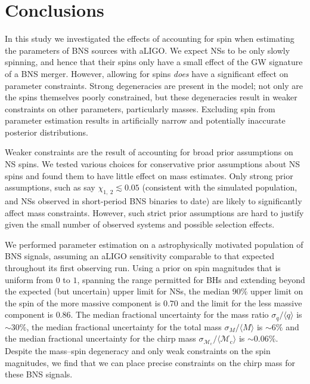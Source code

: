 \section{Conclusions}\label{sec:conclusions}

In this study we investigated the effects of accounting for spin when estimating the parameters of BNS sources with aLIGO. We expect NSs to be only slowly spinning, and hence that their spins only have a small effect of the GW signature of a BNS merger. However, allowing for spins \textit{does} have a significant effect on parameter constraints. Strong degeneracies are present in the model; not only are the spins themselves poorly constrained, but these degeneracies result in weaker constraints on other parameters, particularly masses.  Excluding spin from parameter estimation results in artificially narrow and potentially inaccurate posterior distributions.

Weaker constraints are the result of accounting for broad prior assumptions on NS spins.  We tested various choices for conservative prior assumptions about NS spins and found them to have little effect on mass estimates.  Only strong prior assumptions, such as say $\chi_{1,~2}\lesssim 0.05$ (consistent with the simulated population, and NSs observed in short-period BNS binaries to date) are likely to significantly affect mass constraints.  However, such strict prior assumptions are hard to justify given the small number of observed systems and possible selection effects.

We performed parameter estimation on a astrophysically motivated population of BNS signals, assuming an aLIGO sensitivity comparable to that expected throughout its first observing run. Using a prior on spin magnitudes that is uniform from $0$ to $1$, spanning the range permitted for BHs and extending beyond the expected (but uncertain) upper limit for NSs, the median $90\%$ upper limit on the spin of the more massive component is $0.70$ and the limit for the less massive component is $0.86$. The median fractional uncertainty for the mass ratio $\sigma_q/\langle q \rangle$ is $\sim30\%$, the median fractional uncertainty for the total mass $\sigma_{{M}}/\langle {M} \rangle$ is $\sim6\%$ and the median fractional uncertainty for the chirp mass $\sigma_{\mathcal{M}_\mathrm{c}}/\langle {\mathcal{M}_\mathrm{c}} \rangle$ is $\sim0.06\%$. Despite the mass--spin degeneracy and only weak constraints on the spin magnitudes, we find that we can place precise constraints on the chirp mass for these BNS signals.


